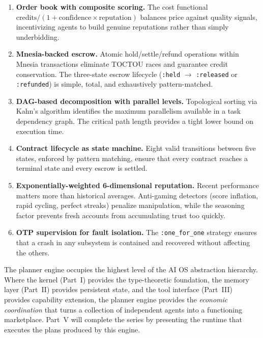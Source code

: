 \documentclass[12pt,a4paper]{article}
\theoremstyle{plain}
\theoremstyle{definition}
\begin{document}
\begin{enumerate}
    \item \textbf{Order book with composite scoring.} The cost functional $\text{credits} / (1 + \text{confidence} \times \text{reputation})$ balances price against quality signals, incentivizing agents to build genuine reputations rather than simply underbidding.

    \item \textbf{Mnesia-backed escrow.} Atomic hold/settle/refund operations within Mnesia transactions eliminate TOCTOU races and guarantee credit conservation. The three-state escrow lifecycle (\texttt{:held} $\to$ \texttt{:released} or \texttt{:refunded}) is simple, total, and exhaustively pattern-matched.

    \item \textbf{DAG-based decomposition with parallel levels.} Topological sorting via Kahn's algorithm identifies the maximum parallelism available in a task dependency graph. The critical path length provides a tight lower bound on execution time.

    \item \textbf{Contract lifecycle as state machine.} Eight valid transitions between five states, enforced by pattern matching, ensure that every contract reaches a terminal state and every escrow is settled.

    \item \textbf{Exponentially-weighted 6-dimensional reputation.} Recent performance matters more than historical averages. Anti-gaming detectors (score inflation, rapid cycling, perfect streaks) penalize manipulation, while the seasoning factor prevents fresh accounts from accumulating trust too quickly.

    \item \textbf{OTP supervision for fault isolation.} The \texttt{:one\_for\_one} strategy ensures that a crash in any subsystem is contained and recovered without affecting the others.
\end{enumerate}

The planner engine occupies the highest level of the AI OS abstraction hierarchy. Where the kernel (Part~I) provides the type-theoretic foundation, the memory layer (Part~II) provides persistent state, and the tool interface (Part~III) provides capability extension, the planner engine provides the \emph{economic coordination} that turns a collection of independent agents into a functioning marketplace. Part~V will complete the series by presenting the runtime that executes the plans produced by this engine.
\end{document}
